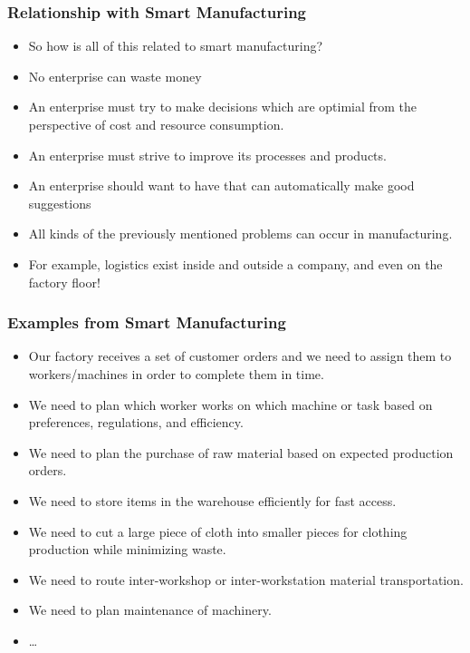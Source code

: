 \documentclass[mathserif]{beamer}%
\begin{document}
%
%
\begin{frame}%
\frametitle{Relationship with Smart Manufacturing}%
\begin{itemize}%
\item So how is all of this related to smart manufacturing?%
\item<2-> No enterprise can waste money%
\item<7-> An enterprise must try to make decisions which are optimial from the perspective of cost and resource consumption.%
\item<8-> An enterprise must strive to improve its processes and products.%
\item<9-> An enterprise should want to have  that can automatically make good suggestions%
%
\item<14-> All kinds of the previously mentioned problems can occur in manufacturing.%
\item<15-> For example, logistics exist inside and outside a company, and even on the factory floor!%
\end{itemize}%
\end{frame}
%
%
\begin{frame}%
\frametitle{Examples from Smart Manufacturing}%
\begin{itemize}%
\item Our factory receives a set of customer orders and we need to assign them to workers/machines in order to complete them in time.%
\item<2-> We need to plan which worker works on which machine or task based on preferences, regulations, and efficiency.%
\item<3-> We need to plan the purchase of raw material based on expected production orders.%
\item<4-> We need to store items in the warehouse efficiently for fast access.%
\item<5-> We need to cut a large piece of cloth into smaller pieces for clothing production while minimizing waste.%
\item<6-> We need to route inter-workshop or inter-workstation material transportation.%
\item<7-> We need to plan maintenance of machinery.%
\item<8-> \dots%
\end{itemize}%
\end{frame}%
\end{document}
